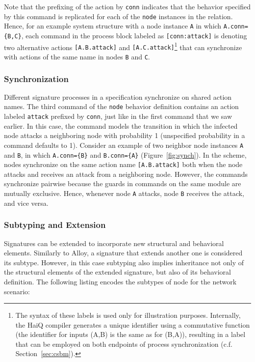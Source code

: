 \documentclass[10pt,journal,compsoc]{IEEEtran}
\begin{document}
Note that the prefixing of the action by {\tt conn} indicates that the behavior specified by this command is replicated for each of the {\tt node} instances in the relation. 
Hence, for an example system structure with a node instance {\tt A} in which {\tt A.conn=\{B,C\}}, each command in the process block labeled as {\tt [conn:attack]} is denoting two alternative actions {\tt [A.B.attack]} and {\tt[A.C.attack]}\footnote{The syntax of these labels is used only for illustration purposes. Internally, the {\sf HaiQ} compiler generates a unique identifier using a commutative function (the identifier for inputs (A,B) is the same as for (B,A)), resulting in a label that can be employed on both endpoints of process synchronization (c.f. Section~\ref{sec:csbm}).} that can synchronize with actions of the same name in nodes {\tt B} and {\tt C}.

\subsubsection{Synchronization}



Different signature processes in a specification synchronize on shared action names. 
The third command of the {\tt node} behavior definition contains an action labeled {\tt attack} prefixed by {\tt conn}, just like in the first command that we saw earlier. 
In this case, the command models the transition in which the infected node attacks a neighboring node with probability 1 (unspecified probability in a command defaults to 1). 
Consider an example of two neighbor node instances {\tt A} and {\tt B}, in which {\tt A.conn=\{B\}} and {\tt B.conn=\{A\}} (Figure~\ref{fig:synch}). 
In the scheme, nodes synchronize on the same action name {\tt [A.B.attack]} both when the node attacks and receives an attack from a neighboring node. 
However, the commands synchronize pairwise because the guards in commands on the same module are mutually exclusive. 
Hence, whenever node {\tt A} attacks, node {\tt B} receives the attack, and vice versa.

\subsubsection{Subtyping and Extension}

Signatures can be extended to incorporate new structural and behavioral elements. 
Similarly to Alloy, a signature that extends another one is considered its subtype. 
However, in this case subtyping also implies inheritance not only of the structural elements of the extended signature, but also of its behavioral definition.
The following listing encodes the subtypes of node for the network scenario:
\end{document}
